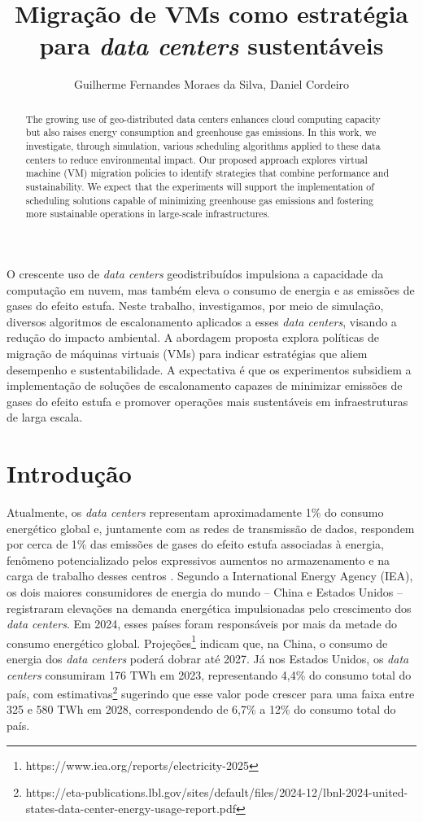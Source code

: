\documentclass[12pt]{article}
\title{Migração de VMs como estratégia para \textit{data centers} sustentáveis}
\author{Guilherme Fernandes Moraes da Silva\inst{1}, Daniel Cordeiro\inst{1}}
\begin{document}
 

\maketitle

\begin{abstract}
The growing use of geo-distributed data centers enhances cloud computing capacity but also raises energy consumption and greenhouse gas emissions. In this work, we investigate, through simulation, various scheduling algorithms applied to these data centers to reduce environmental impact. Our proposed approach explores virtual machine (VM) migration policies to identify strategies that combine performance and sustainability. We expect that the experiments will support the implementation of scheduling solutions capable of minimizing greenhouse gas emissions and fostering more sustainable operations in large-scale infrastructures.
\end{abstract}
     
\begin{resumo}
O crescente uso de \textit{data centers} geodistribuídos impulsiona a capacidade da computação em nuvem, mas também eleva o consumo de energia e as emissões de gases do efeito estufa. Neste trabalho, investigamos, por meio de simulação, diversos algoritmos de escalonamento aplicados a esses \textit{data centers}, visando a redução do impacto ambiental. A abordagem proposta explora políticas de migração de máquinas virtuais (VMs) para indicar estratégias que aliem desempenho e sustentabilidade. A expectativa é que os experimentos subsidiem a implementação de soluções de escalonamento capazes de minimizar emissões de gases do efeito estufa e promover operações mais sustentáveis em infraestruturas de larga escala.
\end{resumo}


\section{Introdução}
Atualmente, os \textit{data centers} representam aproximadamente 1\% do consumo energético global e, juntamente com as redes de transmissão de dados, respondem por cerca de 1\% das emissões de gases do efeito estufa associadas à energia, fenômeno potencializado pelos expressivos aumentos no armazenamento e na carga de trabalho desses centros \cite{masanet:20}. Segundo a International Energy Agency (IEA), os dois maiores consumidores de energia do mundo -- China e Estados Unidos -- registraram elevações na demanda energética impulsionadas pelo crescimento dos \textit{data centers}. Em 2024, esses países foram responsáveis por mais da metade do consumo energético global. Projeções\footnote{https://www.iea.org/reports/electricity-2025} indicam que, na China, o consumo de energia dos \textit{data centers} poderá dobrar até 2027. Já nos Estados Unidos, os \textit{data centers} consumiram 176 TWh em 2023, representando 4,4\% do consumo total do país, com estimativas\footnote{https://eta-publications.lbl.gov/sites/default/files/2024-12/lbnl-2024-united-states-data-center-energy-usage-report.pdf} sugerindo que esse valor pode crescer para uma faixa entre 325 e 580 TWh em 2028, correspondendo de 6,7\% a 12\% do consumo total do país.
\end{document}
